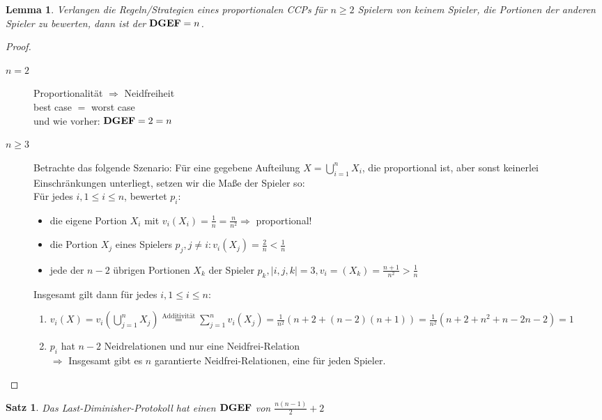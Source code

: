 \documentclass[a4paper,10pt]{scrartcl}
\newtheorem*{satz}{Satz}
\newtheorem*{lemma}{Lemma}
\newcommand{\DGEF}{\text{\textbf{DGEF}}}
\begin{document}
\begin{lemma}
 Verlangen die Regeln/Strategien eines proportionalen CCPs für $n\geq2$ Spielern von keinem Spieler, die Portionen der anderen Spieler
 zu bewerten, dann ist der $\DGEF=n$.
\end{lemma}
\begin{proof}
 \begin{description}
  \item[$n=2$] Proportionalität $\Rightarrow$ Neidfreiheit\\best case $=$ worst case\\und wie vorher: $\DGEF=2=n$
  \item[$n\geq3$] Betrachte das folgende Szenario: Für eine gegebene Aufteilung $X=\bigcup\limits_{i=1}^nX_i$, die proportional ist, aber sonst
                  keinerlei Einschränkungen unterliegt, setzen wir die Maße der Spieler so: \\Für jedes $i, 1\leq i\leq n$, bewertet $p_i$:
                  \begin{itemize}
                   \item die eigene Portion $X_i$ mit $v_i(X_i)=\frac{1}{n}=\frac{n}{n^2}\Rightarrow$ proportional!
                   \item die Portion $X_j$ eines Spielers $p_j, j\neq i: v_i(X_j)=\frac{2}{n}<\frac{1}{n}$
                   \item jede der $n-2$ übrigen Portionen $X_k$ der Spieler $p_k, |{i,j,k}|=3, v_i=(X_k)=\frac{n+1}{n^2}>\frac{1}{n}$
                  \end{itemize}
                  Insgesamt gilt dann für jedes $i, 1\leq i\leq n$:
                  \begin{enumerate}
                   \item $v_i(X)=v_i(\bigcup\limits_{j=1}^nX_j)\stackrel{\text{Additivität}}{=}\sum\limits_{j=1}^nv_i(X_j)=
                         \frac{1}{n^2}(n+2+(n-2)(n+1))=\frac{1}{n^2}(n+2+n^2+n-2n-2)=1$
                   \item $p_i$ hat $n-2$ Neidrelationen und nur eine Neidfrei-Relation\\$\Rightarrow$ Insgesamt gibt es $n$ garantierte 
                         Neidfrei-Relationen, eine für jeden Spieler.
                  \end{enumerate}
 \end{description}
\end{proof}

\begin{satz}
 Das Last-Diminisher-Protokoll hat einen $\DGEF$ von $\frac{n(n-1)}{2}+2$
\end{satz}
\end{document}
